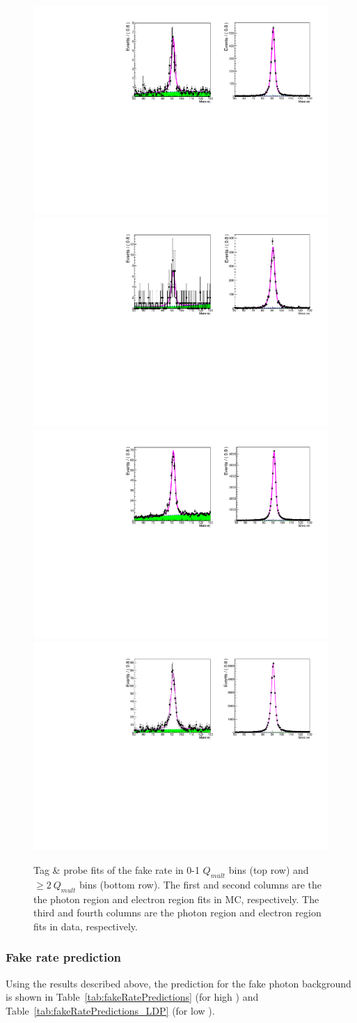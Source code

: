 \begin{figure}[h!]
\centering
\includegraphics[width=0.48\linewidth]{../Figures/Chap3/fake_rate_tag_and_probe/tag_probe_MC_fit_qmult_0_1.pdf}
\includegraphics[width=0.48\linewidth]{../Figures/Chap3/fake_rate_tag_and_probe/tag_probe_fit_qmult_0_1.pdf}\\
\includegraphics[width=0.48\linewidth]{../Figures/Chap3/fake_rate_tag_and_probe/tag_probe_MC_fit_qmult_2_100.pdf}
\includegraphics[width=0.48\linewidth]{../Figures/Chap3/fake_rate_tag_and_probe/tag_probe_fit_qmult_2_100.pdf}\\
\captionsetup{width=.9\linewidth}
\caption[Tag \& probe fits for data and MC]{Tag \& probe fits of the fake rate in 0-1 $Q_{mult}$ bins (top row) and $\geq2\ Q_{mult}$ bins (bottom row).
The first and second columns are the
the photon region and electron region fits in MC, respectively. The third and fourth columns are 
the photon region and electron region fits in data, respectively.}
\label{fig:tpFits}
\end{figure}

\subsubsection{Fake rate prediction}
Using the results described above, the prediction for the fake photon background is shown in 
Table~\ref{tab:fakeRatePredictions} (for high \dphi) and Table~\ref{tab:fakeRatePredictions_LDP} (for low \dphi).